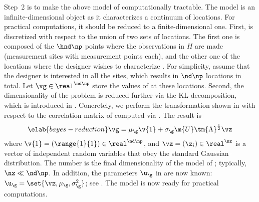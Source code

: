 Step~2 is to make the above model of \g computationally tractable. The model is
an infinite-dimensional object as it characterizes a continuum of locations. For
practical computations, it should be reduced to a finite-dimensional one. First,
\g is discretized with respect to the union of two sets of locations. The first
one is composed of the $\hnd \np$ points where the observations in $H$ are made
(\hnd measurement sites with \np measurement points each), and the other one of
the locations where the designer wishes to characterize \g. For simplicity,
assume that the designer is interested in all the sites, which results in $\nd
\np$ locations in total. Let $\vg \in \real^{\nd \np}$ store the values of \g at
these locations. Second, the dimensionality of the problem is reduced further
via the \ac{KL} decomposition, which is introduced in
. Concretely, we perform the transformation
shown in  with respect to the correlation matrix of
\vg computed via . The result is
\begin{equation} \elab{bayes-reduction}
  \vg = \mu_\g \v{1} + \sigma_\g \m{U} \tm{\Lambda}^\frac{1}{2} \vz
\end{equation}
where $\v{1} = (\range{1}{1}) \in \real^{\nd \np}$, and $\vz = (\z_i) \in
\real^\nz$ is a vector of independent random variables that obey the standard
Gaussian distribution. The number \nz is the final dimensionality of the model
of \g; typically, $\nz \ll \nd \np$. In addition, the parameters $\u_\g$ in
 are now known: $\u_\g = \set{\vz, \mu_\g,
\sigma^2_\g}$; see . The model is now ready for
practical computations.

